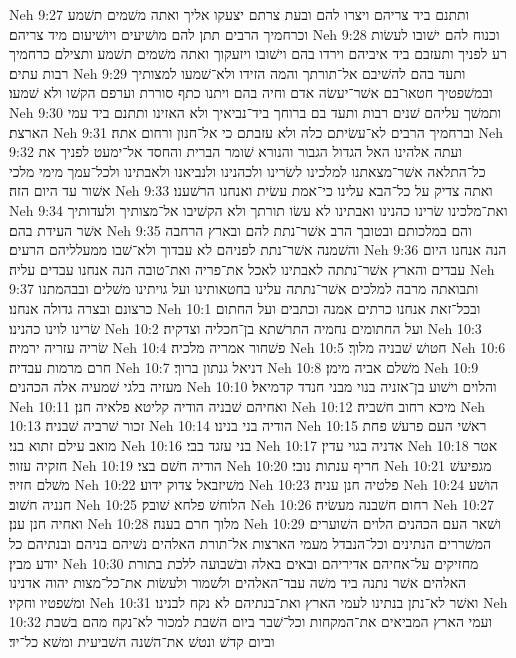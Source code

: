 Neh 9:27  ותתנם ביד צריהם ויצרו להם ובעת צרתם יצעקו אליך ואתה משׁמים תשׁמע וכרחמיך הרבים תתן להם מושׁיעים ויושׁיעום מיד צריהם׃
Neh 9:28  וכנוח להם ישׁובו לעשׂות רע לפניך ותעזבם ביד איביהם וירדו בהם וישׁובו ויזעקוך ואתה משׁמים תשׁמע ותצילם כרחמיך רבות עתים׃
Neh 9:29  ותעד בהם להשׁיבם אל־תורתך והמה הזידו ולא־שׁמעו למצותיך ובמשׁפטיך חטאו־בם אשׁר־יעשׂה אדם וחיה בהם ויתנו כתף סוררת וערפם הקשׁו ולא שׁמעו׃
Neh 9:30  ותמשׁך עליהם שׁנים רבות ותעד בם ברוחך ביד־נביאיך ולא האזינו ותתנם ביד עמי הארצת׃
Neh 9:31  וברחמיך הרבים לא־עשׂיתם כלה ולא עזבתם כי אל־חנון ורחום אתה׃
Neh 9:32  ועתה אלהינו האל הגדול הגבור והנורא שׁומר הברית והחסד אל־ימעט לפניך את כל־התלאה אשׁר־מצאתנו למלכינו לשׂרינו ולכהנינו ולנביאנו ולאבתינו ולכל־עמך מימי מלכי אשׁור עד היום הזה׃
Neh 9:33  ואתה צדיק על כל־הבא עלינו כי־אמת עשׂית ואנחנו הרשׁענו׃
Neh 9:34  ואת־מלכינו שׂרינו כהנינו ואבתינו לא עשׂו תורתך ולא הקשׁיבו אל־מצותיך ולעדותיך אשׁר העידת בהם׃
Neh 9:35  והם במלכותם ובטובך הרב אשׁר־נתת להם ובארץ הרחבה והשׁמנה אשׁר־נתת לפניהם לא עבדוך ולא־שׁבו ממעלליהם הרעים׃
Neh 9:36  הנה אנחנו היום עבדים והארץ אשׁר־נתתה לאבתינו לאכל את־פריה ואת־טובה הנה אנחנו עבדים עליה׃
Neh 9:37  ותבואתה מרבה למלכים אשׁר־נתתה עלינו בחטאותינו ועל גויתינו משׁלים ובבהמתנו כרצונם ובצרה גדולה אנחנו׃
Neh 10:1  ובכל־זאת אנחנו כרתים אמנה וכתבים ועל החתום שׂרינו לוינו כהנינו׃
Neh 10:2  ועל החתומים נחמיה התרשׁתא בן־חכליה וצדקיה׃
Neh 10:3  שׂריה עזריה ירמיה׃
Neh 10:4  פשׁחור אמריה מלכיה׃
Neh 10:5  חטושׁ שׁבניה מלוך׃
Neh 10:6  חרם מרמות עבדיה׃
Neh 10:7  דניאל גנתון ברוך׃
Neh 10:8  משׁלם אביה מימן׃
Neh 10:9  מעזיה בלגי שׁמעיה אלה הכהנים׃
Neh 10:10  והלוים וישׁוע בן־אזניה בנוי מבני חנדד קדמיאל׃
Neh 10:11  ואחיהם שׁבניה הודיה קליטא פלאיה חנן׃
Neh 10:12  מיכא רחוב חשׁביה׃
Neh 10:13  זכור שׁרביה שׁבניה׃
Neh 10:14  הודיה בני בנינו׃
Neh 10:15  ראשׁי העם פרעשׁ פחת מואב עילם זתוא בני׃
Neh 10:16  בני עזגד בבי׃
Neh 10:17  אדניה בגוי עדין׃
Neh 10:18  אטר חזקיה עזור׃
Neh 10:19  הודיה חשׁם בצי׃
Neh 10:20  חריף ענתות נובי׃
Neh 10:21  מגפיעשׁ משׁלם חזיר׃
Neh 10:22  משׁיזבאל צדוק ידוע׃
Neh 10:23  פלטיה חנן עניה׃
Neh 10:24  הושׁע חנניה חשׁוב׃
Neh 10:25  הלוחשׁ פלחא שׁובק׃
Neh 10:26  רחום חשׁבנה מעשׂיה׃
Neh 10:27  ואחיה חנן ענן׃
Neh 10:28  מלוך חרם בענה׃
Neh 10:29  ושׁאר העם הכהנים הלוים השׁוערים המשׁררים הנתינים וכל־הנבדל מעמי הארצות אל־תורת האלהים נשׁיהם בניהם ובנתיהם כל יודע מבין׃
Neh 10:30  מחזיקים על־אחיהם אדיריהם ובאים באלה ובשׁבועה ללכת בתורת האלהים אשׁר נתנה ביד משׁה עבד־האלהים ולשׁמור ולעשׂות את־כל־מצות יהוה אדנינו ומשׁפטיו וחקיו׃
Neh 10:31  ואשׁר לא־נתן בנתינו לעמי הארץ ואת־בנתיהם לא נקח לבנינו׃
Neh 10:32  ועמי הארץ המביאים את־המקחות וכל־שׁבר ביום השׁבת למכור לא־נקח מהם בשׁבת וביום קדשׁ ונטשׁ את־השׁנה השׁביעית ומשׁא כל־יד׃
